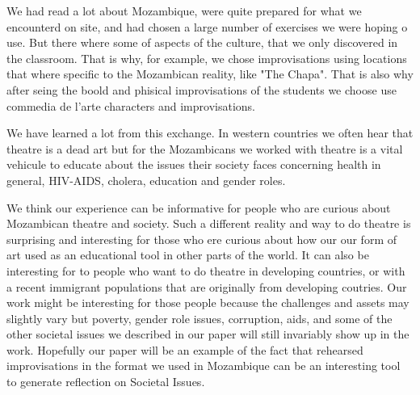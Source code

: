 \documentclass[article,twocolumn,twoside]{memoir}
\begin{document}
We had read a lot about Mozambique, were quite prepared for what we encounterd
on site, and had chosen a large number of exercises we were hoping o use. But
there where some of aspects of the culture, that we only discovered in the
classroom. That is why, for example, we chose improvisations using locations
that where specific to the Mozambican reality, like "The Chapa". That is also
why after seing the boold and phisical improvisations of the students we choose
use commedia de l'arte characters and improvisations.

We have learned a lot from this exchange. In western countries we often hear
that theatre is a dead art but for the Mozambicans we worked with theatre is a
vital vehicule to educate about the issues their society faces concerning
health in general, HIV-AIDS, cholera, education and gender roles. 

We think our experience can be informative for people who are curious about
Mozambican theatre and society. Such a different reality and way to do theatre
is surprising and interesting for those who ere curious about how our our form
of art used as an educational tool in other parts of the world. It can also be
interesting for to people who want to do theatre in developing countries, or
with a recent immigrant populations that are originally from developing coutries.
Our work might be interesting for those people because the challenges and assets
may slightly vary but poverty, gender role issues, corruption, aids, and some
of the other societal issues we described in our paper will still invariably
show up in the work. Hopefully our paper will be an example of the fact that
rehearsed improvisations in the format we used in Mozambique can be an
interesting tool to generate reflection on Societal Issues.
\end{document}
